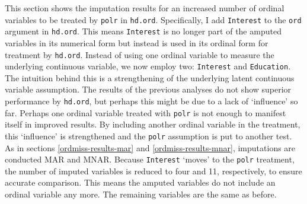 \documentclass[12pt,econ]{sources/authesis}
\begin{document}
This section shows the imputation results for an increased number of ordinal variables to be treated by \texttt{polr} in \texttt{hd.ord}. Specifically, I add \texttt{Interest} to the \texttt{ord} argument in \texttt{hd.ord}. This means \texttt{Interest} is no longer part of the amputed variables in its numerical form but instead is used in its ordinal form for treatment by \texttt{hd.ord}. Instead of using one ordinal variable to measure the underlying continuous variable, we now employ two: \texttt{Interest} and \texttt{Education}. The intuition behind this is a strengthening of the underlying latent continuous variable assumption. The results of the previous analyses do not show superior performance by \texttt{hd.ord}, but perhaps this might be due to a lack of `influence' so far. Perhaps one ordinal variable treated with \texttt{polr} is not enough to manifest itself in improved results. By including another ordinal variable in the treatment, this `influence' is strengthened and the \texttt{polr} assumption is put to another test. As in sections \ref{ordmiss-results-mar} and \ref{ordmiss-results-mnar}, imputations are conducted MAR and MNAR. Because \texttt{Interest} `moves' to the \texttt{polr} treatment, the number of imputed variables is reduced to four and 11, respectively, to ensure accurate comparison. This means the amputed variables do not include an ordinal variable any more. The remaining variables are the same as before.
\end{document}
